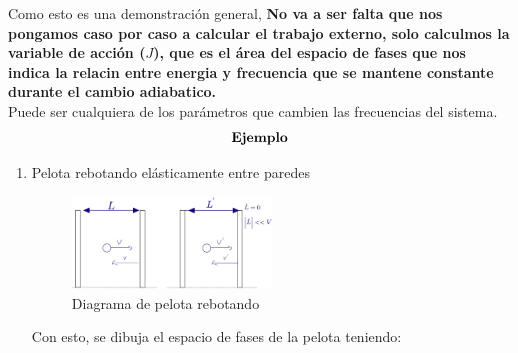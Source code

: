 \documentclass[12pt]{article}
\newcommand{\ej}{\[\textrm{\textbf{Ejemplo}} \]}
\begin{document}
Como esto es una demonstración general, \textbf{No va a ser falta que nos pongamos caso por caso a calcular el trabajo externo, solo calculmos la variable de acción ($J$), que es el área del espacio de fases que nos indica la relacin entre energia y frecuencia que se mantene constante durante el cambio adiabatico.}\\
Puede ser cualquiera de los parámetros que cambien las frecuencias del sistema.
\ej
\begin{enumerate}
	\item Pelota rebotando elásticamente entre paredes \\
	\begin{figure}[h!]
    \centering
    \includegraphics[width=0.5\textwidth]{diagrama_pelota.png}
    \caption{Diagrama de pelota rebotando}
    \label{d_pe}
\end{figure}
Con esto, se dibuja el espacio de fases de la pelota teniendo:


\end{enumerate}
\end{document}
